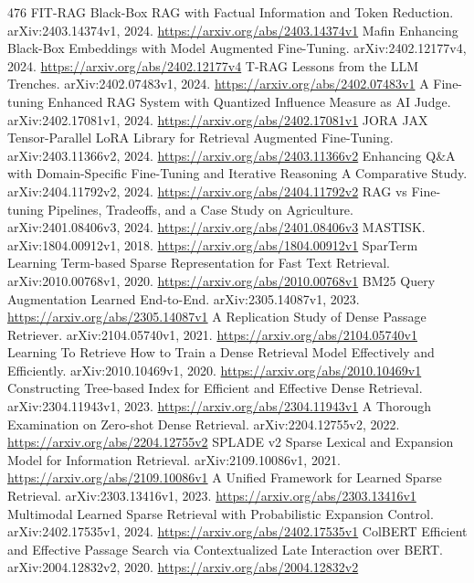 \documentclass[11pt]{article}
\begin{document}
\begin{thebibliography}{476}
 FIT-RAG Black-Box RAG with Factual Information and Token Reduction. arXiv:2403.14374v1, 2024. \url{https://arxiv.org/abs/2403.14374v1}
 Mafin Enhancing Black-Box Embeddings with Model Augmented Fine-Tuning. arXiv:2402.12177v4, 2024. \url{https://arxiv.org/abs/2402.12177v4}
 T-RAG Lessons from the LLM Trenches. arXiv:2402.07483v1, 2024. \url{https://arxiv.org/abs/2402.07483v1}
 A Fine-tuning Enhanced RAG System with Quantized Influence Measure as AI Judge. arXiv:2402.17081v1, 2024. \url{https://arxiv.org/abs/2402.17081v1}
 JORA JAX Tensor-Parallel LoRA Library for Retrieval Augmented Fine-Tuning. arXiv:2403.11366v2, 2024. \url{https://arxiv.org/abs/2403.11366v2}
 Enhancing Q\&A with Domain-Specific Fine-Tuning and Iterative Reasoning A Comparative Study. arXiv:2404.11792v2, 2024. \url{https://arxiv.org/abs/2404.11792v2}
 RAG vs Fine-tuning Pipelines, Tradeoffs, and a Case Study on Agriculture. arXiv:2401.08406v3, 2024. \url{https://arxiv.org/abs/2401.08406v3}
 MASTISK. arXiv:1804.00912v1, 2018. \url{https://arxiv.org/abs/1804.00912v1}
 SparTerm Learning Term-based Sparse Representation for Fast Text Retrieval. arXiv:2010.00768v1, 2020. \url{https://arxiv.org/abs/2010.00768v1}
 BM25 Query Augmentation Learned End-to-End. arXiv:2305.14087v1, 2023. \url{https://arxiv.org/abs/2305.14087v1}
 A Replication Study of Dense Passage Retriever. arXiv:2104.05740v1, 2021. \url{https://arxiv.org/abs/2104.05740v1}
 Learning To Retrieve How to Train a Dense Retrieval Model Effectively and Efficiently. arXiv:2010.10469v1, 2020. \url{https://arxiv.org/abs/2010.10469v1}
 Constructing Tree-based Index for Efficient and Effective Dense Retrieval. arXiv:2304.11943v1, 2023. \url{https://arxiv.org/abs/2304.11943v1}
 A Thorough Examination on Zero-shot Dense Retrieval. arXiv:2204.12755v2, 2022. \url{https://arxiv.org/abs/2204.12755v2}
 SPLADE v2 Sparse Lexical and Expansion Model for Information Retrieval. arXiv:2109.10086v1, 2021. \url{https://arxiv.org/abs/2109.10086v1}
 A Unified Framework for Learned Sparse Retrieval. arXiv:2303.13416v1, 2023. \url{https://arxiv.org/abs/2303.13416v1}
 Multimodal Learned Sparse Retrieval with Probabilistic Expansion Control. arXiv:2402.17535v1, 2024. \url{https://arxiv.org/abs/2402.17535v1}
 ColBERT Efficient and Effective Passage Search via Contextualized Late Interaction over BERT. arXiv:2004.12832v2, 2020. \url{https://arxiv.org/abs/2004.12832v2}

\end{thebibliography}
\end{document}
